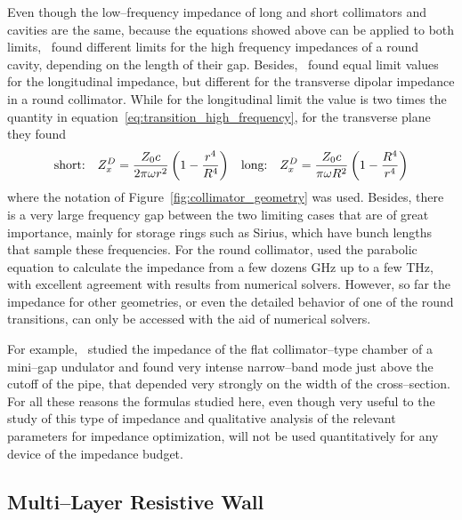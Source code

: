     Even though the low--frequency impedance of long and short collimators and cavities are the same, because the equations showed above can be applied to both limits,~ found different limits for the high frequency impedances of a round cavity, depending on the length of their gap. Besides,~ found equal limit values for the longitudinal impedance, but different for the transverse dipolar impedance in a round collimator. While for the longitudinal limit the value is two times the quantity in equation~\eqref{eq:transition_high_frequency}, for the transverse plane they found
    \begin{align}
        \text{short:}\quad Z_x^D = \frac{Z_0c}{2\pi\omega r^2}\left(1-\frac{r^4}{R^4}\right) &&
        \text{long:}\quad Z_x^D = \frac{Z_0c}{\pi\omega R^2}\left(1-\frac{R^4}{r^4}\right)
    \end{align}
    where the notation of Figure~\ref{fig:collimator_geometry} was used. Besides, there is a very large frequency gap between the two limiting cases that are of great importance, mainly for storage rings such as Sirius, which have bunch lengths that sample these frequencies. For the round collimator,  used the parabolic equation to calculate the impedance from a few dozens \si{\giga\hertz} up to a few \si{\tera\hertz}, with excellent agreement with results from numerical solvers. However, so far the impedance for other geometries, or even the detailed behavior of one of the round transitions, can only be accessed with the aid of numerical solvers.

    For example,~ studied the impedance of the flat collimator--type chamber of a mini--gap undulator and found very intense narrow--band mode just above the cutoff of the pipe, that depended very strongly on the width of the cross--section. For all these reasons the formulas studied here, even though very useful to the study of this type of impedance and qualitative analysis of the relevant parameters for impedance optimization, will not be used quantitatively for any device of the impedance budget.

\subsection{Multi--Layer Resistive Wall}

